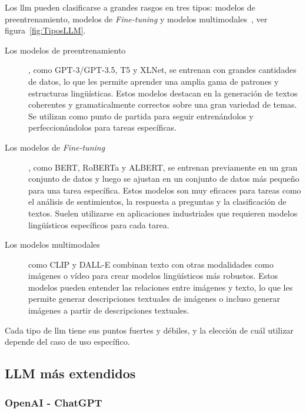 Los \acrlong{llm} pueden clasificarse a grandes rasgos en tres tipos: modelos de preentrenamiento, modelos de \textit{Fine-tuning} y modelos multimodales~\cite{scribbleData}, ver figura~\ref{fig:TiposLLM}.

\begin{description}

\item[Los modelos de preentrenamiento], como GPT-3/GPT-3.5, T5 y XLNet, se entrenan con grandes cantidades de datos, lo que les permite aprender una amplia gama de patrones y estructuras lingüísticas. Estos modelos destacan en la generación de textos coherentes y gramaticalmente correctos sobre una gran variedad de temas. Se utilizan como punto de partida para seguir entrenándolos y perfeccionándolos para tareas específicas.

\item[Los modelos de \textit{Fine-tuning}], como BERT, RoBERTa y ALBERT, se entrenan previamente en un gran conjunto de datos y luego se ajustan en un conjunto de datos más pequeño para una tarea específica. Estos modelos son muy eficaces para tareas como el análisis de sentimientos, la respuesta a preguntas y la clasificación de textos. Suelen utilizarse en aplicaciones industriales que requieren modelos lingüísticos específicos para cada tarea.

\item[Los modelos multimodales] como CLIP y DALL-E combinan texto con otras modalidades como imágenes o vídeo para crear modelos lingüísticos más robustos. Estos modelos pueden entender las relaciones entre imágenes y texto, lo que les permite generar descripciones textuales de imágenes o incluso generar imágenes a partir de descripciones textuales.

\end{description}

Cada tipo de \acrshort{llm} tiene sus puntos fuertes y débiles, y la elección de cuál utilizar depende del caso de uso específico.


\subsection{LLM más extendidos}

\subsubsection{OpenAI - ChatGPT} \label{openai}

